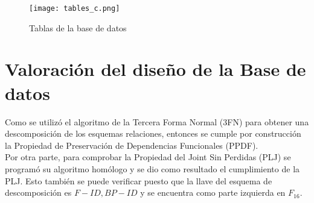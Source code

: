\documentclass{report}
\begin{document}
    \begin{figure}[htb]
        \centering
        \texttt{[image: tables\_c.png]}
        \caption{Tablas de la base de datos}
    \end{figure}

    \section*{Valoración del diseño de la Base de datos}
    Como se utilizó el algoritmo de la Tercera Forma Normal (3FN) para obtener una descomposición de los esquemas relaciones, 
    entonces se cumple por construcción la Propiedad de Preservación de Dependencias Funcionales (PPDF). \\

    Por otra parte, para comprobar la Propiedad del Joint Sin Perdidas (PLJ) se programó su algoritmo homólogo y se dio como resultado el cumplimiento de la PLJ.
    Esto también se puede verificar puesto que la llave del esquema de descomposición es $F-ID, BP-ID$ y se encuentra como parte izquierda en $F_{16}$.
\end{document}
